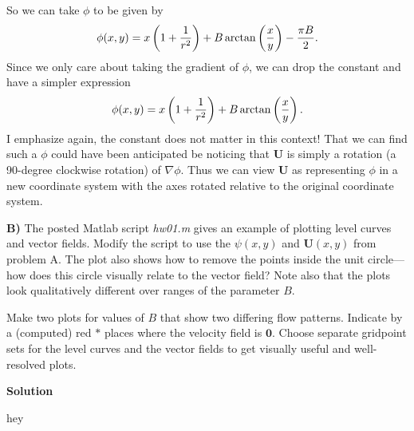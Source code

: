 \documentclass{article}
\def\*#1{\mathbf{#1}}
\begin{document}
%
So we can take $\phi$ to be given by
%
\begin{equation*}
    \phi(x, y) = x \del{1 + \frac{1}{r^2}} + B \arctan \del{\frac{x}{y}} - \frac{\pi B}{2}
    .
\end{equation*}
%
Since we only care about taking the gradient of $\phi$, we can drop the
constant and have a simpler expression
%
\begin{equation*}
    \phi(x, y) = x \del{1 + \frac{1}{r^2}} + B \arctan \del{\frac{x}{y}}
    .
\end{equation*}
%
I emphasize again, the constant does not matter in this context! That we
can find such a $\phi$ could have been anticipated be noticing that
$\*U$ is simply a rotation (a 90-degree clockwise rotation) of $\nabla
\phi$. Thus we can view $\*U$ as representing $\phi$ in a new coordinate
system with the axes rotated relative to the original coordinate system.

\newpage

\textbf{B)} The posted Matlab script \textit{hw01.m} gives an example of
plotting level curves and vector fields. Modify the script to use the
$\psi(x, y)$ and $\*U(x, y)$ from problem A. The plot also
shows how to remove the points inside the unit circle---how does this
circle visually relate to the vector field? Note also that the plots
look qualitatively different over ranges of the parameter $B$.

Make two plots for values of $B$ that show two differing flow patterns.
Indicate by a (computed) red $\ast$ places where the velocity field is
$\*0$. Choose separate gridpoint sets for the level curves and the
vector fields to get visually useful and well-resolved plots.

\textbf{Solution}

hey
\end{document}
